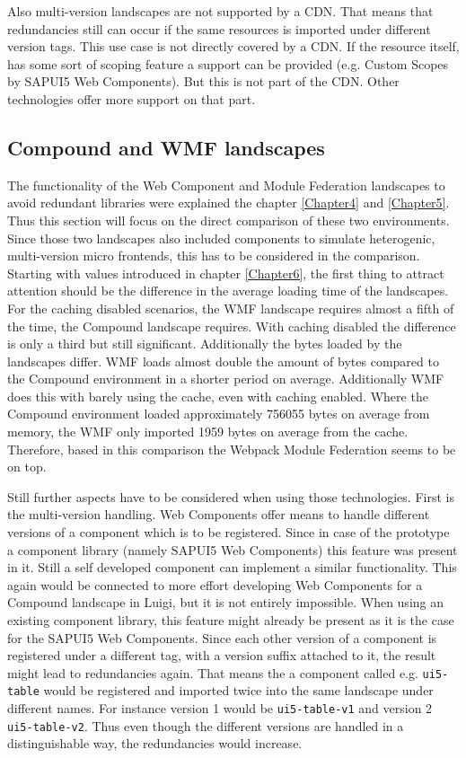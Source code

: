 Also multi-version landscapes are not supported by a CDN. That means that redundancies still can occur if the same resources is imported under different version tags. This use case is not directly covered by a CDN. If the resource itself, has some sort of scoping feature a support can be provided (e.g. Custom Scopes by SAPUI5 Web Components). But this is not part of the CDN. Other technologies offer more support on that part.

\subsection{Compound and WMF landscapes}

The functionality of the Web Component and Module Federation landscapes to avoid redundant libraries were explained the chapter \ref{Chapter4} and \ref{Chapter5}. Thus this section will focus on the direct comparison of these two environments. Since those two landscapes also included components to simulate heterogenic, multi-version micro frontends, this has to be considered in the comparison. 
Starting with values introduced in chapter \ref{Chapter6}, the first thing to attract attention should be the difference in the average loading time of the landscapes. For the caching disabled scenarios, the WMF landscape requires almost a fifth of the time, the Compound landscape requires. With caching disabled the difference is only a third but still significant. Additionally the bytes loaded by the landscapes differ. WMF loads almost double the amount of bytes compared to the Compound environment in a shorter period on average. Additionally WMF does this with barely using the cache, even with caching enabled. Where the Compound environment loaded approximately 756055 bytes on average from memory, the WMF only imported 1959 bytes on average from the cache. Therefore, based in this comparison the Webpack Module Federation seems to be on top.

Still further aspects have to be considered when using those technologies. First is the multi-version handling. Web Components offer means to handle different versions of a component which is to be registered. Since in case of the prototype a component library (namely SAPUI5 Web Components) this feature was present in it. Still a self developed component can implement a similar functionality. This again would be connected to more effort developing Web Components for a Compound landscape in Luigi, but it is not entirely impossible.
When using an existing component library, this feature might already be present as it is the case for the SAPUI5 Web Components. 
Since each other version of a component is registered under a different tag, with a version suffix attached to it, the result might lead to redundancies again. That means the a component called e.g. \texttt{ui5-table} would be registered and imported twice into the same landscape under different names. For instance version 1 would be \texttt{ui5-table-v1} and version 2 \texttt{ui5-table-v2}. Thus even though the different versions are handled in a distinguishable way, the redundancies would increase.

